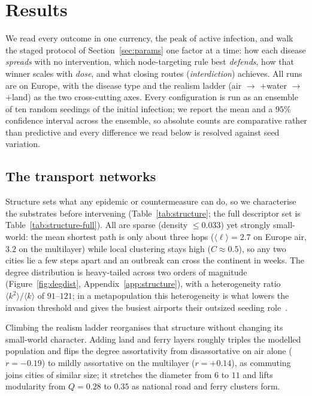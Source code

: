 \section{Results}\label{sec:results}
We read every outcome in one currency, the peak of active infection, and walk the staged protocol
of Section~\ref{sec:params} one factor at a time: how each disease \emph{spreads} with no
intervention, which node-targeting rule best \emph{defends}, how that winner scales with
\emph{dose}, and what closing routes (\emph{interdiction}) achieves. All runs are on Europe, with
the disease type and the realism ladder (air $\rightarrow$ $+$water $\rightarrow$ $+$land) as the
two cross-cutting axes. Every configuration is run as an ensemble of ten random seedings of the
initial infection; we report the mean and a $95\%$ confidence interval across the ensemble, so
absolute counts are comparative rather than predictive and every difference we read below is
resolved against seed variation.

\subsection{The transport networks}\label{sec:res-structure}
Structure sets what any epidemic or countermeasure can do, so we characterise the substrates before
intervening (Table~\ref{tab:structure}; the full descriptor set is Table~\ref{tab:structure-full}).
All are sparse (density $\le 0.033$) yet strongly small-world: the mean shortest path is only about
three hops ($\langle\ell\rangle = 2.7$ on Europe air, $3.2$ on the multilayer) while local clustering
stays high ($C \approx 0.5$), so any two cities lie a few steps apart and an outbreak can cross the
continent in weeks. The degree distribution is heavy-tailed across two orders of magnitude
(Figure~\ref{fig:degdist}, Appendix~\ref{app:structure}), with a heterogeneity ratio $\langle k^2\rangle/\langle k\rangle$ of
$91$--$121$; in a metapopulation this heterogeneity is what lowers the invasion threshold and gives
the busiest airports their outsized seeding role~\cite{colizza:invasion}.

Climbing the realism ladder reorganises that structure without changing its small-world character.
Adding land and ferry layers roughly triples the modelled population and flips the degree
assortativity from disassortative on air alone ($r=-0.19$) to mildly assortative on the multilayer
($r=+0.14$), as commuting joins cities of similar size; it stretches the diameter from $6$ to $11$
and lifts modularity from $Q=0.28$ to $0.35$ as national road and ferry clusters form.

